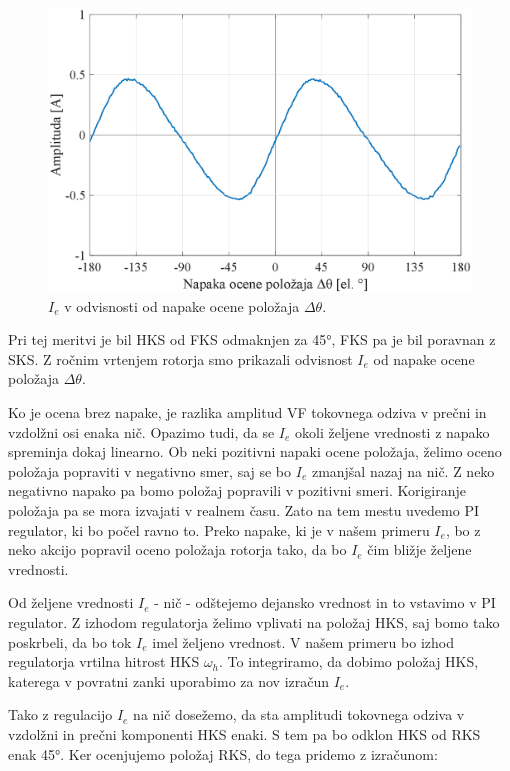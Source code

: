 \documentclass[a4paper,twoside,openright,12pt,slovene]{book}
\begin{document}
\begin{figure}[!htbp]
    \centering
    \includegraphics[width=0.99\columnwidth]{Slike/reguliranaVelicinaIdq0.eps}
    \caption{\label{reguliranaVelicinaIdq0} $I_e$ v odvisnosti od napake ocene položaja $\Delta\theta$.}
\end{figure}

Pri tej meritvi je bil HKS od FKS odmaknjen za 45°, FKS pa je bil poravnan z SKS. Z ročnim vrtenjem rotorja smo prikazali odvisnost $I_e$ od napake ocene položaja $\Delta\theta$. 

Ko je ocena brez napake, je razlika amplitud VF tokovnega odziva v prečni in vzdolžni osi enaka nič. Opazimo tudi, da se $I_e$ okoli željene vrednosti z napako spreminja dokaj linearno. Ob neki
pozitivni napaki ocene položaja, želimo oceno položaja popraviti v negativno smer, saj se bo $I_e$ zmanjšal nazaj na nič. Z neko negativno napako pa bomo položaj popravili v pozitivni smeri.
Korigiranje položaja pa se mora izvajati v realnem času. Zato na tem mestu uvedemo PI regulator, ki bo počel ravno to. Preko napake, ki je v našem primeru $I_e$, bo z neko akcijo popravil oceno
položaja rotorja tako, da bo $I_e$ čim bližje željene vrednosti.

Od željene vrednosti $I_e$ - nič - odštejemo dejansko vrednost in to vstavimo v PI regulator. Z izhodom regulatorja želimo vplivati na položaj HKS, saj bomo tako poskrbeli, da bo tok $I_e$ imel
željeno vrednost. V našem primeru bo izhod regulatorja vrtilna hitrost HKS $\omega_h$. To integriramo, da dobimo položaj HKS, katerega v povratni zanki uporabimo za nov izračun $I_e$. 

Tako z regulacijo $I_e$ na nič dosežemo, da sta amplitudi tokovnega odziva v vzdolžni in prečni komponenti HKS enaki. S tem pa bo odklon HKS od RKS enak 45°. Ker ocenjujemo položaj RKS, do
tega pridemo z izračunom:
\end{document}

